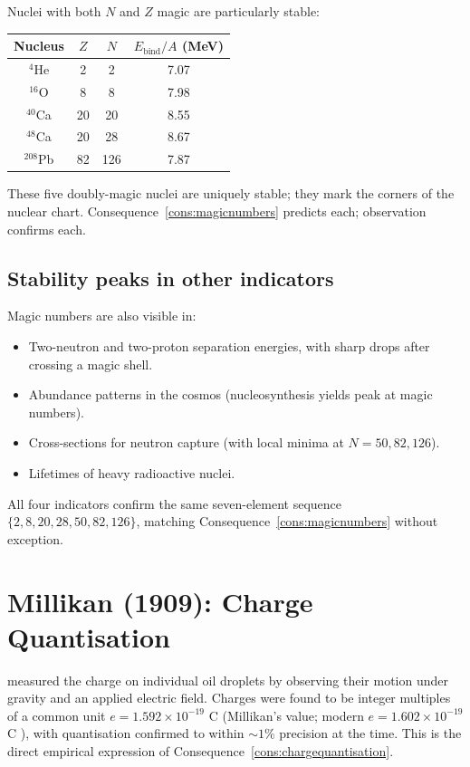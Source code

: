 \documentclass[11pt,twocolumn,a4paper]{article}
\theoremstyle{axiomstyle}
\theoremstyle{conseqstyle}
\theoremstyle{definition}
\theoremstyle{remark}
\begin{document}
Nuclei with both $N$ and $Z$ magic are particularly stable:
\begin{center}
\begin{tabular}{c|c|c|c}
\toprule
Nucleus & $Z$ & $N$ & $E_{\text{bind}}/A$ (MeV)\\
\midrule
$^{4}$He  & 2  & 2  & 7.07 \\
$^{16}$O  & 8  & 8  & 7.98 \\
$^{40}$Ca & 20 & 20 & 8.55 \\
$^{48}$Ca & 20 & 28 & 8.67 \\
$^{208}$Pb & 82 & 126 & 7.87 \\
\bottomrule
\end{tabular}
\end{center}

These five doubly-magic nuclei are uniquely stable; they mark the corners of the nuclear chart. Consequence~\ref{cons:magicnumbers} predicts each; observation confirms each.

\subsection{Stability peaks in other indicators}

Magic numbers are also visible in:
\begin{itemize}
\item Two-neutron and two-proton separation energies, with sharp drops after crossing a magic shell.
\item Abundance patterns in the cosmos (nucleosynthesis yields peak at magic numbers).
\item Cross-sections for neutron capture (with local minima at $N=50, 82, 126$).
\item Lifetimes of heavy radioactive nuclei.
\end{itemize}

All four indicators confirm the same seven-element sequence $\{2,8,20,28,50,82,126\}$, matching Consequence~\ref{cons:magicnumbers} without exception.

\section{Millikan (1909): Charge Quantisation}
\label{sec:millikanempirical}

\citet{millikan1913} measured the charge on individual oil droplets by observing their motion under gravity and an applied electric field. Charges were found to be integer multiples of a common unit $e=1.592\times 10^{-19}$ C (Millikan's value; modern $e=1.602\times 10^{-19}$ C \citep{codata2018}), with quantisation confirmed to within $\sim 1\%$ precision at the time. This is the direct empirical expression of Consequence~\ref{cons:chargequantisation}.
\end{document}
